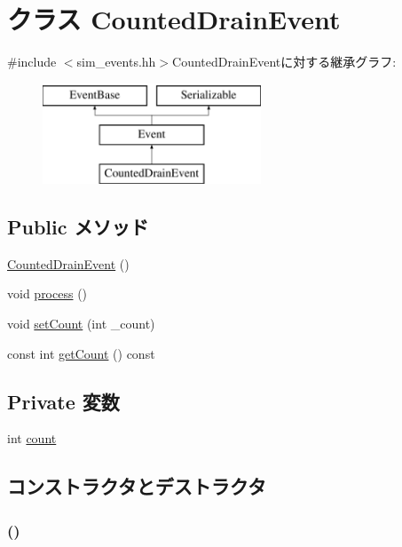 \hypertarget{classCountedDrainEvent}{
\section{クラス CountedDrainEvent}
\label{classCountedDrainEvent}
}


{\ttfamily \#include $<$sim\_\-events.hh$>$}CountedDrainEventに対する継承グラフ:\begin{figure}[H]
\begin{center}
\leavevmode
\includegraphics[height=3cm]{classCountedDrainEvent}
\end{center}
\end{figure}
\subsection*{Public メソッド}
\begin{DoxyCompactItemize}
\item 
\hyperlink{classCountedDrainEvent_a472cd541704deca867278376288751bd}{CountedDrainEvent} ()
\item 
void \hyperlink{classCountedDrainEvent_a2e9c5136d19b1a95fc427e0852deab5c}{process} ()
\item 
void \hyperlink{classCountedDrainEvent_a0d3feb8a189bccc5d1de6ab4d59c6af6}{setCount} (int \_\-count)
\item 
const int \hyperlink{classCountedDrainEvent_aa501d80e5abb55d3cf617940e72be67b}{getCount} () const 
\end{DoxyCompactItemize}
\subsection*{Private 変数}
\begin{DoxyCompactItemize}
\item 
int \hyperlink{classCountedDrainEvent_ad43c3812e6d13e0518d9f8b8f463ffcf}{count}
\end{DoxyCompactItemize}


\subsection{コンストラクタとデストラクタ}
\hypertarget{classCountedDrainEvent_a472cd541704deca867278376288751bd}{
\subsubsection[{CountedDrainEvent}]{ ()}}
\label{classCountedDrainEvent_a472cd541704deca867278376288751bd}


